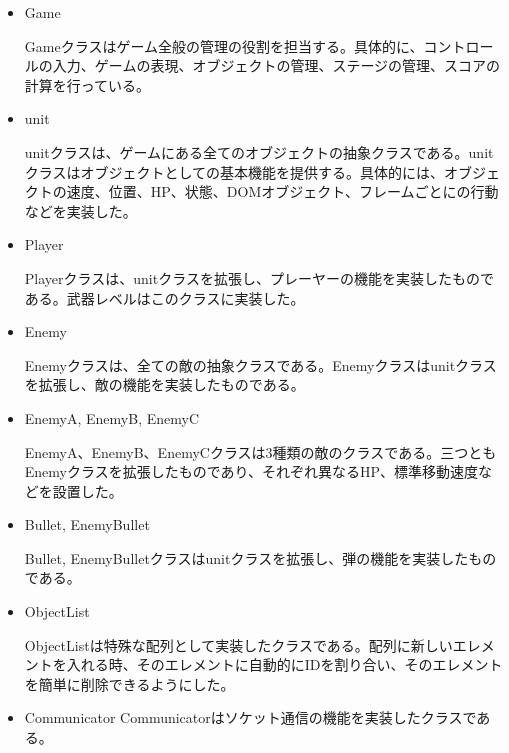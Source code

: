
	\begin{itemize}
		\item Game
		
		Gameクラスはゲーム全般の管理の役割を担当する。具体的に、コントロールの入力、ゲームの表現、オブジェクトの管理、ステージの管理、スコアの計算を行っている。
		\item unit
		
		unitクラスは、ゲームにある全てのオブジェクトの抽象クラスである。unitクラスはオブジェクトとしての基本機能を提供する。具体的には、オブジェクトの速度、位置、HP、状態、DOMオブジェクト、フレームごとにの行動などを実装した。
		\item Player
		
		Playerクラスは、unitクラスを拡張し、プレーヤーの機能を実装したものである。武器レベルはこのクラスに実装した。
		\item Enemy
		
		Enemyクラスは、全ての敵の抽象クラスである。Enemyクラスはunitクラスを拡張し、敵の機能を実装したものである。
		
		\item EnemyA, EnemyB, EnemyC
		
		EnemyA、EnemyB、EnemyCクラスは3種類の敵のクラスである。三つともEnemyクラスを拡張したものであり、それぞれ異なるHP、標準移動速度などを設置した。
		
		\item Bullet, EnemyBullet
		
		Bullet, EnemyBulletクラスはunitクラスを拡張し、弾の機能を実装したものである。
		
		\item ObjectList
		
		ObjectListは特殊な配列として実装したクラスである。配列に新しいエレメントを入れる時、そのエレメントに自動的にIDを割り合い、そのエレメントを簡単に削除できるようにした。
		
		\item Communicator
		Communicatorはソケット通信の機能を実装したクラスである。
	\end{itemize}